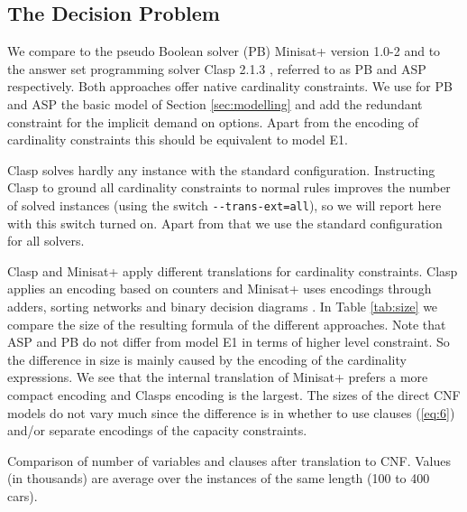 \documentclass[]{easychair}
\begin{document}
\subsection{The Decision Problem}

We compare to the pseudo Boolean solver (PB) Minisat+ version 1.0-2 \cite{Een06} and to the answer set programming
solver Clasp 2.1.3 \cite{Gebser07}, referred to as PB and ASP respectively. Both approaches offer native cardinality
constraints. We use for PB and ASP the basic model of Section \ref{sec:modelling} and add the redundant constraint for
the implicit demand on options. Apart from the encoding of cardinality constraints this should be equivalent to model
E1. 
      
Clasp solves hardly any instance with the standard configuration. Instructing Clasp to ground all cardinality
constraints to normal rules improves the number of solved instances (using the switch \verb+--trans-ext=all+), so we
will report here with this switch turned on. Apart from that we use the standard configuration for all solvers. 

Clasp and Minisat+ apply different translations for cardinality constraints. Clasp applies an encoding based on counters
and Minisat+ uses encodings through adders, sorting networks and binary decision diagrams \cite{Een06}. In Table
\ref{tab:size} we compare the size of the resulting formula of the different approaches.  Note that ASP and PB do not
differ from model E1 in terms of higher level constraint. So the difference in size is mainly caused by the encoding of
the cardinality expressions. We see that the internal translation of Minisat+ prefers a more compact encoding  and
Clasps encoding is the largest. The sizes of the direct CNF models do not vary much since the difference is in whether
to use clauses (\ref{eq:6}) and/or separate encodings of the capacity constraints.

\begin{table}[htbp] 
    \caption{Comparison of number of variables and clauses after translation to CNF. Values (in thousands) are average
    over the instances of the same length (100 to 400 cars).} 
    \centering
    
    \label{tab:size}
\end{table}
\end{document}
